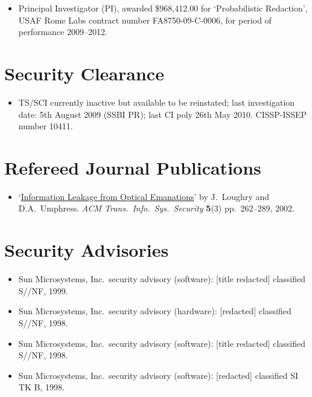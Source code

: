 \documentclass[12pt,letterpaper]{article}
\begin{document}
\vspace{-2mm}
\begin{itemize}
	\item Principal Investigator (PI), awarded \$968,412.00 for `Probabilistic Redaction',
	USAF Rome Labs contract number FA8750-09-C-0006, for period of performance 2009--2012.
\end{itemize}

\vspace{-8mm}
\section*{Security Clearance}

\vspace{-2mm}
\begin{itemize}
	\item TS/SCI currently inactive but available to be reinstated; last investigation date:
		5th August 2009 (SSBI PR); last CI poly 26th May 2010.  CISSP-ISSEP number 10411.
\end{itemize}



\section*{Refereed Journal Publications}

\begin{itemize}
    \item `\href{http://dl.acm.org/citation.cfm?doid=545186.545189}{Information Leakage
	from Optical Emanations}' by J.\ Loughry and D.A.\ Umphress. \emph{ACM
	Trans.\ Info.\ Sys.\ Security} \textbf{5}(3) pp.\ 262--289, 2002.
\end{itemize}

\vspace{-8mm}
\section*{Security Advisories}

\begin{itemize}
    \item Sun Microsystems, Inc.\ security advisory (software): [title redacted] classified S//NF,
		1999.
	\vspace{-2mm}
	\item Sun Microsystems, Inc.\ security advisory (hardware): [redacted] classified S//NF,
		1998.
	\vspace{-2mm}
	\item Sun Microsystems, Inc.\ security advisory (software): [title redacted] classified S//NF,
		1998.
	\vspace{-2mm}
	\item Sun Microsystems, Inc.\ security advisory (software): [redacted] classified SI TK B, 1998.
\end{itemize}
\end{document}
